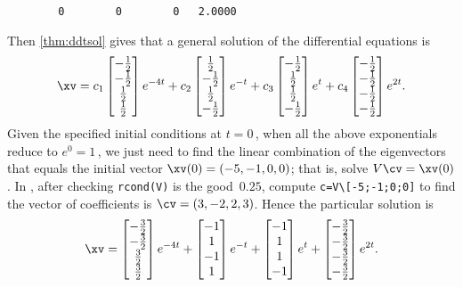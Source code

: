 \begin{example}
\begin{solution}
\begin{verbatim}
        0        0        0   2.0000
\end{verbatim}
Then \autoref{thm:ddtsol} gives that a general solution of the differential equations is
\begin{equation*}
\xv=
c_1\begin{bmatrix} -\tfrac12\\-\tfrac12\\\tfrac12\\\tfrac12 \end{bmatrix}e^{-4t}
+c_2\begin{bmatrix} \tfrac12\\-\tfrac12\\\tfrac12\\-\tfrac12 \end{bmatrix}e^{-t}
+c_3\begin{bmatrix} -\tfrac12\\\tfrac12\\\tfrac12\\-\tfrac12 \end{bmatrix}e^{t}
+c_4\begin{bmatrix} -\tfrac12\\-\tfrac12\\-\tfrac12\\-\tfrac12 \end{bmatrix}e^{2t}.
\end{equation*}
Given the specified initial conditions at \(t=0\)\,, when all the above exponentials reduce to \(e^0=1\)\,, we just need to find the linear combination of the eigenvectors that equals the initial vector \(\xv(0)=(-5,-1,0,0)\); that is, solve \(V\cv=\xv(0)\).
In \script, after checking \verb|rcond(V)| is the good~\(0.25\), compute \verb|c=V\[-5;-1;0;0]| to find the vector of coefficients is \(\cv=(3,-2,2,3)\).
Hence the particular solution is
\begin{equation*}
\xv=
\begin{bmatrix} -\tfrac32\\-\tfrac32\\\tfrac32\\\tfrac32 \end{bmatrix}e^{-4t}
+\begin{bmatrix} -1\\1\\-1\\1 \end{bmatrix}e^{-t}
+\begin{bmatrix} -1\\1\\1\\-1 \end{bmatrix}e^{t}
+\begin{bmatrix} -\tfrac32\\-\tfrac32\\-\tfrac32\\-\tfrac32 \end{bmatrix}e^{2t}.
\end{equation*}
\end{solution}
\end{example}








